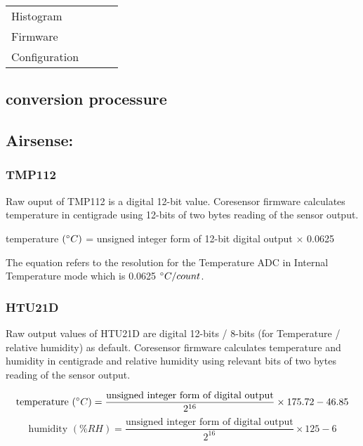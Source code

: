 \begin{center}
\begin{longtable}{|l|l|l|l|}
    \hline \rowcolor{white} \multicolumn{4}{|c|}{{Alpha sensor}} \\ \hline
    Histogram & & & \\
    Firmware & & & \\
    Configuration & & & \\
    \hline
\end{longtable}
\end{center}


\subsection{ conversion processure}

\subsection{Airsense:}
\subsubsection{ TMP112} \label{ssec:first}

Raw ouput of TMP112 is a digital 12-bit value. Coresensor firmware calculates temperature in centigrade using 12-bits of two bytes reading of the sensor output. \\

{\centering
  temperature \((\degree C)\) = unsigned integer form of 12-bit digital output $\times$ 0.0625\par
}

\bigbreak
The equation refers to the resolution for the Temperature ADC in Internal Temperature mode which is 0.0625 \(\degree C/count\).

\subsubsection{ HTU21D}
Raw output values of HTU21D are digital 12-bits / 8-bits (for Temperature / relative humidity) as default. Coresensor firmware calculates  temperature and humidity in centigrade and relative humidity using relevant bits of two bytes reading of the sensor output.

{\centering
 \[ \text{temperature \((\degree C)\)} = \frac{\text{unsigned integer form of digital output}}{2^{16}} \times 175.72 - 46.85 \] 
 \[ \text{humidity \((\%RH)\)} = \frac{\text{unsigned integer form of digital output}}{2^{16}} \times 125 - 6 \]
 \par
 }

